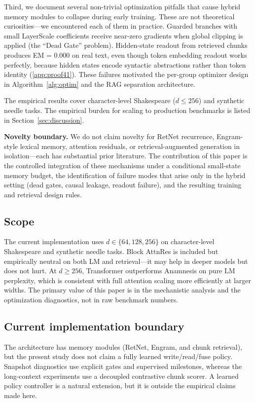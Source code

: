 \documentclass[preprint,12pt]{elsarticle}
\begin{document}
Third, we document several non-trivial optimization pitfalls that cause hybrid memory modules to collapse during early training. These are not theoretical curiosities---we encountered each of them in practice. Guarded branches with small LayerScale coefficients receive near-zero gradients when global clipping is applied (the ``Dead Gate'' problem). Hidden-state readout from retrieved chunks produces EM = 0.000 on real text, even though token embedding readout works perfectly, because hidden states encode syntactic abstractions rather than token identity (\ref{app:proof41}). These failures motivated the per-group optimizer design in Algorithm~\ref{alg:optim} and the RAG separation architecture.

The empirical results cover character-level Shakespeare ($d \leq 256$) and synthetic needle tasks. The empirical burden for scaling to production benchmarks is listed in Section~\ref{sec:discussion}.

\textbf{Novelty boundary.} We do not claim novelty for RetNet recurrence, Engram-style lexical memory, attention residuals, or retrieval-augmented generation in isolation---each has substantial prior literature. The contribution of this paper is the controlled integration of these mechanisms under a conditional small-state memory budget, the identification of failure modes that arise only in the hybrid setting (dead gates, causal leakage, readout failure), and the resulting training and retrieval design rules.

\subsection{Scope}

The current implementation uses $d \in \{64, 128, 256\}$ on character-level Shakespeare and synthetic needle tasks. Block AttnRes is included but empirically neutral on both LM and retrieval---it may help in deeper models but does not hurt. At $d \geq 256$, Transformer outperforms Anamnesis on pure LM perplexity, which is consistent with full attention scaling more efficiently at larger widths. The primary value of this paper is in the mechanistic analysis and the optimization diagnostics, not in raw benchmark numbers.

\subsection{Current implementation boundary}

The architecture has memory modules (RetNet, Engram, and chunk retrieval), but the present study does not claim a fully learned write/read/fuse policy. Snapshot diagnostics use explicit gates and supervised milestones, whereas the long-context experiments use a decoupled contrastive chunk scorer. A learned policy controller is a natural extension, but it is outside the empirical claims made here.
\end{document}
